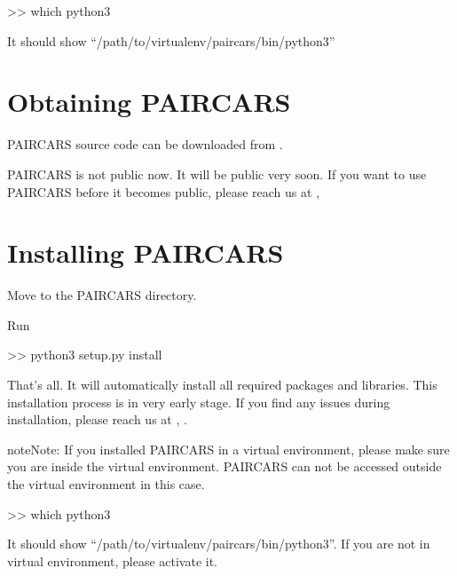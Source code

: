 \documentclass[letterpaper,10pt,english]{sphinxmanual}
\begin{document}
\sphinxAtStartPar
\textgreater{}\textgreater{} which python3

\sphinxAtStartPar
It should show “/path/to/virtualenv/paircars/bin/python3”


\section{Obtaining P\sphinxhyphen{}AIRCARS}
\label{\detokenize{install:obtaining-p-aircars}}
\sphinxAtStartPar
P\sphinxhyphen{}AIRCARS source code can be downloaded from .

\sphinxAtStartPar
P\sphinxhyphen{}AIRCARS is not public now. It will be public very soon. If you want to use P\sphinxhyphen{}AIRCARS before it becomes public, please reach us at , 


\section{Installing P\sphinxhyphen{}AIRCARS}
\label{\detokenize{install:installing-p-aircars}}
\sphinxAtStartPar
Move to the P\sphinxhyphen{}AIRCARS directory.

\sphinxAtStartPar
Run 

\sphinxAtStartPar
\textgreater{}\textgreater{} python3 setup.py install

\sphinxAtStartPar
That’s all. It will automatically install all required packages and libraries. This installation process is in very early stage. If you find any issues during installation, please reach us at , .

\begin{sphinxadmonition}{note}{Note:}
\sphinxAtStartPar
If you installed P\sphinxhyphen{}AIRCARS in a virtual environment, please make sure you are inside the virtual environment. P\sphinxhyphen{}AIRCARS can not be accessed outside the virtual environment in this case.

\sphinxAtStartPar
\textgreater{}\textgreater{} which python3

\sphinxAtStartPar
It should show “/path/to/virtualenv/paircars/bin/python3”. If you are not in virtual environment, please activate it.
\end{sphinxadmonition}
\end{document}

